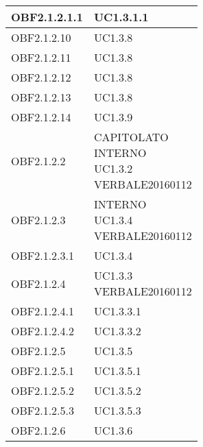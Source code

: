 \documentclass{scalatekids-article}
\begin{document}
\begin{longtable}[H]{|p{5.5cm}|p{5.5cm}|}
  \hline
  OBF2.1.2.1.1 & \multiLineCell[t]{UC1.3.1.1\\}\\
  \hline
  OBF2.1.2.10 & \multiLineCell[t]{UC1.3.8\\}\\
  \hline
  OBF2.1.2.11 & \multiLineCell[t]{UC1.3.8\\}\\
  \hline
  OBF2.1.2.12 & \multiLineCell[t]{UC1.3.8\\}\\
  \hline
  OBF2.1.2.13 & \multiLineCell[t]{UC1.3.8\\}\\
  \hline
  OBF2.1.2.14 & \multiLineCell[t]{UC1.3.9\\}\\
  \hline
  OBF2.1.2.2 & \multiLineCell[t]{CAPITOLATO\\INTERNO\\UC1.3.2\\VERBALE20160112\\}\\
  \hline
  OBF2.1.2.3 & \multiLineCell[t]{INTERNO\\UC1.3.4\\VERBALE20160112\\}\\
  \hline
  OBF2.1.2.3.1 & \multiLineCell[t]{UC1.3.4\\}\\
  \hline
  OBF2.1.2.4 & \multiLineCell[t]{UC1.3.3\\VERBALE20160112\\}\\
  \hline
  OBF2.1.2.4.1 & \multiLineCell[t]{UC1.3.3.1\\}\\
  \hline
  OBF2.1.2.4.2 & \multiLineCell[t]{UC1.3.3.2\\}\\
  \hline
  OBF2.1.2.5 & \multiLineCell[t]{UC1.3.5\\}\\
  \hline
  OBF2.1.2.5.1 & \multiLineCell[t]{UC1.3.5.1\\}\\
  \hline
  OBF2.1.2.5.2 & \multiLineCell[t]{UC1.3.5.2\\}\\
  \hline
  OBF2.1.2.5.3 & \multiLineCell[t]{UC1.3.5.3\\}\\
  \hline
  OBF2.1.2.6 & \multiLineCell[t]{UC1.3.6\\}\\

\end{longtable}
\end{document}
